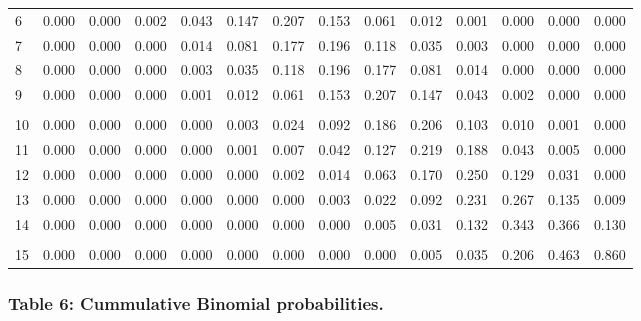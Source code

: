 \documentclass[
]{article}
\begin{document}
\begin{longtable}[t]{lrrrrrrrrrrrrr}
\hspace{1em}6 & 0.000 & 0.000 & 0.002 & 0.043 & 0.147 & 0.207 & 0.153 & 0.061 & 0.012 & 0.001 & 0.000 & 0.000 & 0.000\\
\hspace{1em}7 & 0.000 & 0.000 & 0.000 & 0.014 & 0.081 & 0.177 & 0.196 & 0.118 & 0.035 & 0.003 & 0.000 & 0.000 & 0.000\\
\hspace{1em}8 & 0.000 & 0.000 & 0.000 & 0.003 & 0.035 & 0.118 & 0.196 & 0.177 & 0.081 & 0.014 & 0.000 & 0.000 & 0.000\\
\hspace{1em}9 & 0.000 & 0.000 & 0.000 & 0.001 & 0.012 & 0.061 & 0.153 & 0.207 & 0.147 & 0.043 & 0.002 & 0.000 & 0.000\\
\addlinespace[-.7em]
\multicolumn{14}{l}{ }\\
\hspace{1em}10 & 0.000 & 0.000 & 0.000 & 0.000 & 0.003 & 0.024 & 0.092 & 0.186 & 0.206 & 0.103 & 0.010 & 0.001 & 0.000\\
\hspace{1em}11 & 0.000 & 0.000 & 0.000 & 0.000 & 0.001 & 0.007 & 0.042 & 0.127 & 0.219 & 0.188 & 0.043 & 0.005 & 0.000\\
\hspace{1em}12 & 0.000 & 0.000 & 0.000 & 0.000 & 0.000 & 0.002 & 0.014 & 0.063 & 0.170 & 0.250 & 0.129 & 0.031 & 0.000\\
\hspace{1em}13 & 0.000 & 0.000 & 0.000 & 0.000 & 0.000 & 0.000 & 0.003 & 0.022 & 0.092 & 0.231 & 0.267 & 0.135 & 0.009\\
\hspace{1em}14 & 0.000 & 0.000 & 0.000 & 0.000 & 0.000 & 0.000 & 0.000 & 0.005 & 0.031 & 0.132 & 0.343 & 0.366 & 0.130\\
\addlinespace[-.7em]
\multicolumn{14}{l}{ }\\
\hspace{1em}15 & 0.000 & 0.000 & 0.000 & 0.000 & 0.000 & 0.000 & 0.000 & 0.000 & 0.005 & 0.035 & 0.206 & 0.463 & 0.860\\
\bottomrule
\end{longtable}
\newpage

\subsubsection{Table 6: Cummulative Binomial
probabilities.}\label{table-6-cummulative-binomial-probabilities.}
\end{document}
